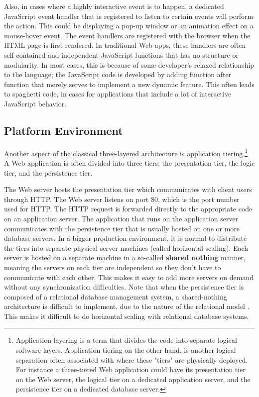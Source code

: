 Also, in cases where a highly interactive event is to happen, a dedicated JavaScript event handler that is registered to listen to certain events will perform the action. This could be displaying a pop-up window or an animation effect on a mouse-hover event. The event handlers are registered with the browser when the HTML page is first rendered. In traditional Web apps, these handlers are often self-contained and independent JavaScript functions that has no structure or modularity. In most cases, this is because of some developer's relaxed relationship to the language; the JavaScript code is developed by adding function after function that merely serves to implement a new dynamic feature. This often leads to spaghetti code\cite{spagetticode}, in cases for applications that include a lot of interactive JavaScript behavior\cite{spagethi}.
				
\subsection{Platform Environment}
Another aspect of the classical three-layered architecture is application tiering.\footnote{Application layering is a term that divides the code into separate logical software layers. Application tiering on the other hand, is another logical separation often associated with where these "tiers" are physically deployed. For instance a three-tiered Web application could have its presentation tier on the Web server, the logical tier on a dedicated application server, and the persistence tier on a dedicated database server.} A Web application is often divided into three tiers; the presentation tier, the logic tier, and the persistence tier. 

The Web server hosts the presentation tier which communicates with client users through HTTP. The Web server listens on port 80, which is the port number used for HTTP. The HTTP request is forwarded directly to the appropriate code on an application server. The application that runs on the application server communicates with the persistence tier that is usually hosted on one or more database servers. In a bigger production environment, it is normal to distribute the tiers into separate physical server machines (called horizontal scaling). Each server is hosted on a separate machine in a so-called \textbf{shared nothing} manner, meaning the servers on each tier are independent so they don't have to communicate with each other. This makes it easy to add more servers on demand without any synchronization difficulties. Note that when the persistence tier is composed of a relational database management system, a shared-nothing architecture is difficult to implement, due to the nature of the relational model \cite{cloudmanagement}. This makes it difficult to do horizontal scaling with relational database systems. 

